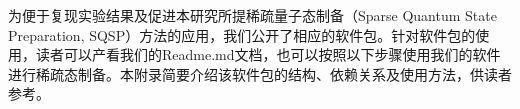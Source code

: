 \documentclass[10.5pt,compsoc,UTF8]{CjC}
\theoremstyle{mystyle}
\begin{document}











\vspace {10mm}

\newpage

\vspace {5mm}




为便于复现实验结果及促进本研究所提稀疏量子态制备（Sparse Quantum State Preparation, SQSP）方法的应用，我们公开了相应的软件包。针对软件包的使用，读者可以产看我们的Readme.md文档，也可以按照以下步骤使用我们的软件进行稀疏态制备。本附录简要介绍该软件包的结构、依赖关系及使用方法，供读者参考。
\end{document}
